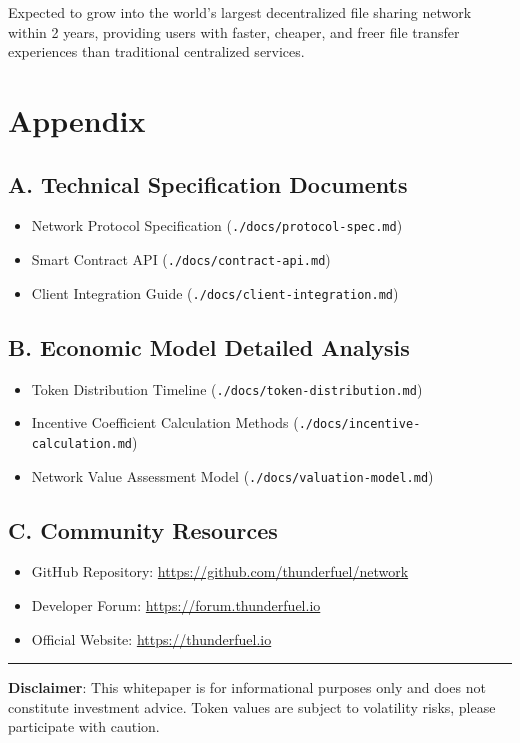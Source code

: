 \documentclass[12pt,a4paper]{article}
\begin{document}
Expected to grow into the world's largest decentralized file sharing network within 2 years, providing users with faster, cheaper, and freer file transfer experiences than traditional centralized services.

\section*{Appendix}

\subsection*{A. Technical Specification Documents}
\begin{itemize}
    \item Network Protocol Specification (\texttt{./docs/protocol-spec.md})
    \item Smart Contract API (\texttt{./docs/contract-api.md})
    \item Client Integration Guide (\texttt{./docs/client-integration.md})
\end{itemize}

\subsection*{B. Economic Model Detailed Analysis}
\begin{itemize}
    \item Token Distribution Timeline (\texttt{./docs/token-distribution.md})
    \item Incentive Coefficient Calculation Methods (\texttt{./docs/incentive-calculation.md})
    \item Network Value Assessment Model (\texttt{./docs/valuation-model.md})
\end{itemize}

\subsection*{C. Community Resources}
\begin{itemize}
    \item GitHub Repository: \url{https://github.com/thunderfuel/network}
    \item Developer Forum: \url{https://forum.thunderfuel.io}
    \item Official Website: \url{https://thunderfuel.io}
\end{itemize}

\vspace{1cm}
\hrule
\vspace{0.5cm}
\textbf{Disclaimer}: This whitepaper is for informational purposes only and does not constitute investment advice. Token values are subject to volatility risks, please participate with caution.
\end{document}

